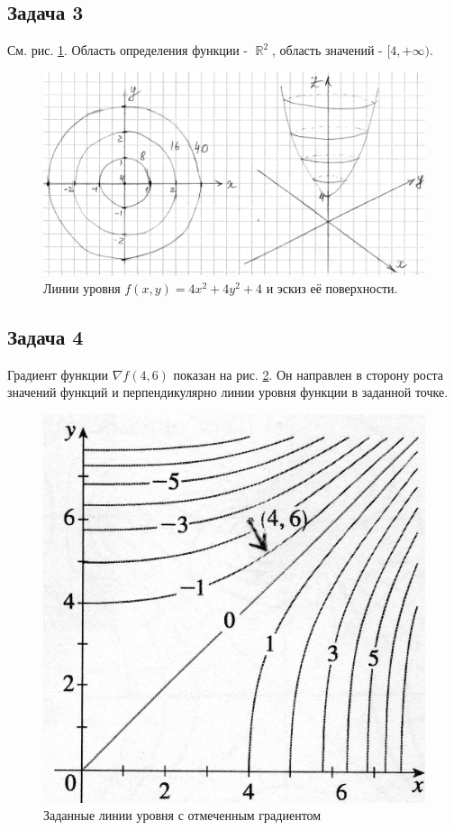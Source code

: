 \documentclass[a4paper,11pt]{article}
\DeclareMathOperator*{\R}{\mathbb{R}}   %
\begin{document}
\subsection{Задача 3}

См. рис. \ref{fig:task3}. Область определения функции - $\R^2$, область значений - $[4, +\infty)$.

\begin{figure}[h!]
  \centering
    \includegraphics{images/task3.jpg}
  \caption{Линии уровня $f(x,y) = 4x^2 + 4y^2 + 4$ и эскиз её поверхности.}
  \label{fig:task3}
\end{figure}

\subsection{Задача 4}

Градиент функции $\nabla f(4, 6)$ показан на рис. \ref{fig:task4}. Он направлен в сторону роста значений функций и перпендикулярно линии уровня функции в заданной точке.

\begin{figure}[h!]
  \centering
    \includegraphics{images/task4.jpg}
  \caption{Заданные линии уровня с отмеченным градиентом}
  \label{fig:task4}
\end{figure}
\end{document}
